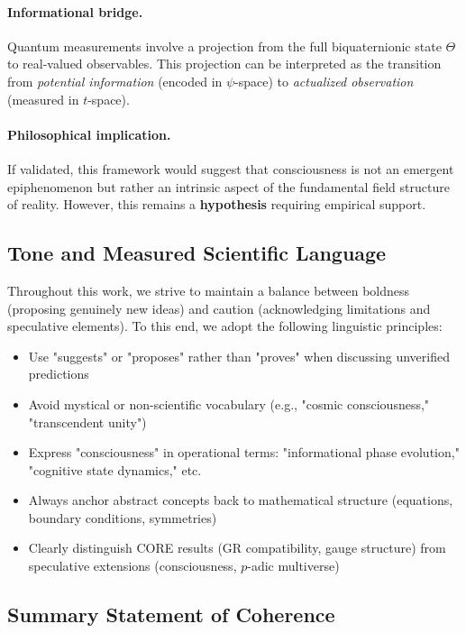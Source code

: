 \paragraph{Informational bridge.} Quantum measurements involve a projection from the full biquaternionic state $\Theta$ to real-valued observables. This projection can be interpreted as the transition from \emph{potential information} (encoded in $\psi$-space) to \emph{actualized observation} (measured in $t$-space).

\paragraph{Philosophical implication.} If validated, this framework would suggest that consciousness is not an emergent epiphenomenon but rather an intrinsic aspect of the fundamental field structure of reality. However, this remains a \textbf{hypothesis} requiring empirical support.

\subsection{Tone and Measured Scientific Language}

Throughout this work, we strive to maintain a balance between boldness (proposing genuinely new ideas) and caution (acknowledging limitations and speculative elements). To this end, we adopt the following linguistic principles:

\begin{itemize}
\item Use "suggests" or "proposes" rather than "proves" when discussing unverified predictions
\item Avoid mystical or non-scientific vocabulary (e.g., "cosmic consciousness," "transcendent unity")
\item Express "consciousness" in operational terms: "informational phase evolution," "cognitive state dynamics," etc.
\item Always anchor abstract concepts back to mathematical structure (equations, boundary conditions, symmetries)
\item Clearly distinguish CORE results (GR compatibility, gauge structure) from speculative extensions (consciousness, $p$-adic multiverse)
\end{itemize}

\subsection{Summary Statement of Coherence}

